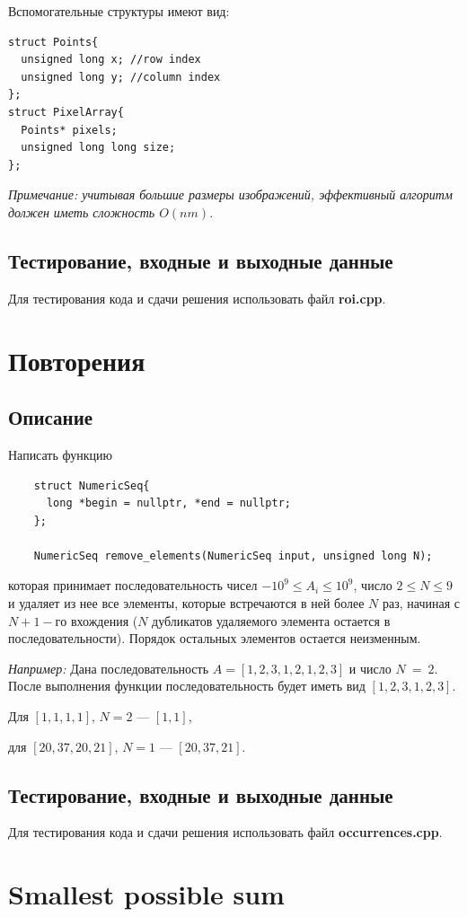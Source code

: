 \documentclass[14pt]{article}
\begin{document}
Вспомогательные структуры имеют вид:
\begin{lstlisting}
struct Points{
  unsigned long x; //row index
  unsigned long y; //column index
};
struct PixelArray{
  Points* pixels;
  unsigned long long size;
};
\end{lstlisting}

\textit{Примечание: учитывая большие размеры изображений, эффективный алгоритм должен иметь сложность $O(nm)$.}
\subsection{Тестирование, входные и выходные данные}
Для тестирования кода и сдачи решения использовать файл \textbf{roi.cpp}.

\section{Повторения}
\subsection{Описание}
Написать функцию
\begin{lstlisting}
    struct NumericSeq{
      long *begin = nullptr, *end = nullptr;
    };
    
    NumericSeq remove_elements(NumericSeq input, unsigned long N);
\end{lstlisting}
которая принимает последовательность чисел $-10^9 \le A_i \le 10^9$, число $2 \le N \le 9$ и удаляет из нее все элементы, которые встречаются в ней более $N$ раз, начиная с $N+1-го$ вхождения ($N$ дубликатов удаляемого элемента остается в последовательности). Порядок остальных элементов остается неизменным. 

\textit{Например:}
Дана последовательность $A = [1,2,3,1,2,1,2,3]$ и число $N~=~2$. После выполнения функции последовательность будет иметь вид $[1,2,3,1,2,3]$.

Для $[1,1,1,1]$, $N=2$ --- $[1, 1]$,

для $[20,37,20,21]$, $N=1$ --- $[20, 37, 21]$.

\subsection{Тестирование, входные и выходные данные}
Для тестирования кода и сдачи решения использовать файл \textbf{occurrences.cpp}.

\section{Smallest possible sum}
\end{document}
